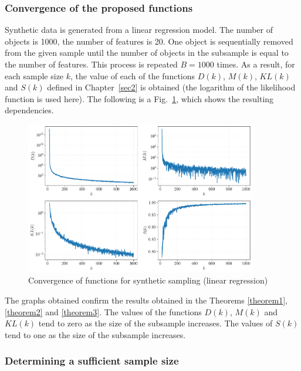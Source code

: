 \documentclass[
11pt,%
tightenlines,%
twoside,%
onecolumn,%
nofloats,%
nobibnotes,%
nofootinbib,%
superscriptaddress,%
noshowpacs,%
centertags]%
{revtex4-2}
\begin{document}
\subsubsection{Convergence of the proposed functions}

Synthetic data is generated from a linear regression model. The number of objects is 1000, the number of features is 20. One object is sequentially removed from the given sample until the number of objects in the subsample is equal to the number of features. This process is repeated $B=1000$ times. As a result, for each sample size $k$, the value of each of the functions $D(k)$, $M(k)$, $KL(k)$ and $S(k)$ defined in Chapter~\ref{sec2} is obtained (the logarithm of the likelihood function is used here). The following is a Fig.~\ref{synthetic-regression-functions}, which shows the resulting dependencies.

\begin{figure}[h!]
    \centering
    \includegraphics[width=0.9\textwidth]{paper/figures/synthetic-regression-functions.pdf}
    \caption{Convergence of functions for synthetic sampling (linear regression)}
    \label{synthetic-regression-functions}
\end{figure}

The graphs obtained confirm the results obtained in the Theorems \ref{theorem1}, \ref{theorem2} and \ref{theorem3}. The values of the functions $D(k)$, $M(k)$ and $KL(k)$ tend to zero as the size of the subsample increases. The values of $S(k)$ tend to one as the size of the subsample increases.

\subsubsection{Determining a sufficient sample size}
\end{document}
